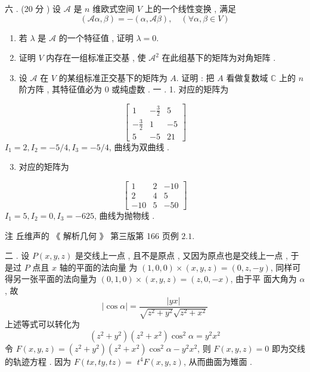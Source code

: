 \documentclass[10pt]{article}
\begin{document}
 六 . (20  分 )  设  $\mathscr{A}$  是  $n$  维欧式空间  $V$  上的一个线性变换 ,  满足 
$$
(\mathscr{A} \alpha, \beta)=-(\alpha, \mathscr{A} \beta), \quad(\forall \alpha, \beta \in V)
$$

\begin{enumerate}
  \item  若  $\lambda$  是  $\mathscr{A}$  的一个特征值 ,  证明  $\lambda=0$.

  \item  证明  $V$  内存在一组标准正交基 ,  使  $\mathscr{A}^{2}$  在此组基下的矩阵为对角矩阵 .

  \item  设  $\mathscr{A}$  在  $V$  的某组标准正交基下的矩阵为  $A$.  证明 :  把  $A$  看做复数域  $\mathbb{C}$  上的  $n$  阶方阵 ,  其特征值必为  0  或纯虚数 .  一 . 1.  对应的矩阵为 

\end{enumerate}
$$
\left[\begin{array}{ccc}
1 & -\frac{3}{2} & 5 \\
-\frac{3}{2} & 1 & -5 \\
5 & -5 & 21
\end{array}\right]
$$
$I_{1}=2, I_{2}=-5 / 4, I_{3}=-5 / 4$,  曲线为双曲线 .

\begin{enumerate}
  \setcounter{enumi}{2}
  \item  对应的矩阵为 
\end{enumerate}
$$
\left[\begin{array}{ccc}
1 & 2 & -10 \\
2 & 4 & 5 \\
-10 & 5 & -50
\end{array}\right]
$$
$I_{1}=5, I_{2}=0, I_{3}=-625$,  曲线为抛物线 .

 注   丘维声的 《 解析几何 》 第三版第  166  页例  $2.1$.

 二 .  设  $P(x, y, z)$  是交线上一点 ,  且不是原点 ,  又因为原点也是交线上一点 ,  于是过  $P$  点且  $x$  轴的平面的法向量   为  $(1,0,0) \times(x, y, z)=(0, z,-y)$,  同样可得另一张平面的法向量为  $(0,1,0) \times(x, y, z)=(z, 0,-x)$,  由于平   面大角为  $\alpha$,  故 
$$
|\cos \alpha|=\frac{|y x|}{\sqrt{z^{2}+y^{2}} \sqrt{z^{2}+x^{2}}}
$$
 上述等式可以转化为 
$$
\left(z^{2}+y^{2}\right)\left(z^{2}+x^{2}\right) \cos ^{2} \alpha=y^{2} x^{2}
$$
 令  $F(x, y, z)=\left(z^{2}+y^{2}\right)\left(z^{2}+x^{2}\right) \cos ^{2} \alpha-y^{2} x^{2}$,  则  $F(x, y, z)=0$  即为交线的轨迹方程 .  因为  $F(t x, t y, t z)=$ $t^{4} F(x, y, z)$,  从而曲面为雉面 .
\end{document}
